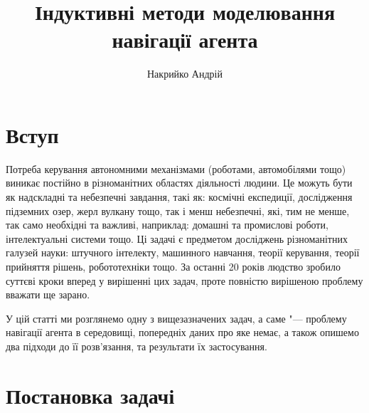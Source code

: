 \documentclass[a4paper,10pt,fleqn]{article}
\title{Індуктивні методи моделювання навігації агента}
\author{Накрийко Андрій}
\begin{document}
\maketitle

\section{Вступ}

Потреба керування автономними механізмами (роботами, автомобілями тощо) виникає постійно в різноманітних областях діяльності людини. Це можуть бути як надскладні та небезпечні завдання, такі як: космічні експедиції, дослідження підземних озер, жерл вулкану тощо, так і менш небезпечні, які, тим не менше, так само необхідні та важливі, наприклад: домашні та промислові роботи, інтелектуальні системи тощо. Ці задачі є предметом досліджень різноманітних галузей науки: штучного інтелекту, машинного навчання, теорії керування, теорії прийняття рішень, робототехніки тощо. За останні 20 років людство зробило суттєві кроки вперед у вирішенні цих задач, проте повністю вирішеною проблему вважати ще зарано.

У цій статті ми розглянемо одну з вищезазначених задач, а саме "--- проблему навігації агента в середовищі, попередніх даних про яке немає, а також опишемо два підходи до її розв'язання, та результати їх застосування.

\section{Постановка задачі}
\end{document}
